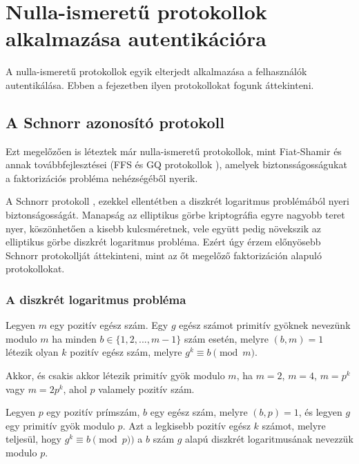 \chapter{Nulla-ismeretű protokollok alkalmazása autentikációra}

A nulla-ismeretű protokollok egyik elterjedt alkalmazása a felhasználók autentikálása. Ebben a fejezetben ilyen protokollokat fogunk áttekinteni.

\section{A Schnorr azonosító protokoll}

Ezt megelőzően is léteztek már nulla-ismeretű protokollok, mint Fiat-Shamir \cite{FiatShamir} és annak továbbfejlesztései (FFS \cite{FeigeFiatShamir} és GQ protokollok \cite{GuillouQuisquater}), amelyek biztonsságosságukat a faktorizációs probléma nehézségéből nyerik. 

A Schnorr protokoll \cite{Schnorr}, ezekkel ellentétben a diszkrét logaritmus problémából nyeri biztonságosságát. Manapság az elliptikus görbe kriptográfia egyre nagyobb teret nyer, köszönhetően a kisebb kulcsméretnek, vele együtt pedig növekszik az elliptikus görbe diszkrét logaritmus probléma. Ezért úgy érzem előnyösebb Schnorr protokollját áttekinteni, mint az őt megelőző faktorizáción alapuló protokollokat.

\subsection{A diszkrét logaritmus probléma}\cite{BerczesPetho}

\begin{definition}
    Legyen $m$ egy pozitív egész szám. Egy $g$ egész számot primitív gyöknek nevezünk modulo $m$ ha minden $b \in \{1,2,...,m-1\}$ szám esetén, melyre $(b,m) = 1$ létezik olyan $k$ pozitív egész szám, melyre $g^k \equiv b \pmod{m}$.
\end{definition}

\begin{theorem}
    Akkor, és csakis akkor létezik primitív gyök modulo $m$, ha $m = 2$, $m = 4$, $m = p^k$ vagy $m = 2p^k$, ahol $p$ valamely pozitív szám.
\end{theorem}

\begin{definition}
    Legyen $p$ egy pozitív prímszám, $b$ egy egész szám, melyre $(b, p) = 1$, és legyen $g$ egy primitív gyök modulo $p$. Azt a legkisebb pozitív egész $k$ számot, melyre teljesül, hogy $g^k \equiv b \pmod{p})$ a $b$ szám $g$ alapú diszkrét logaritmusának nevezzük modulo $p$.
\end{definition}

